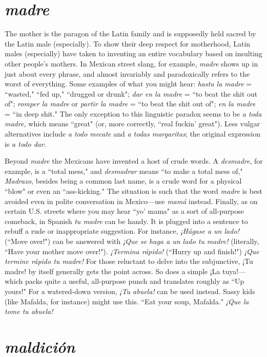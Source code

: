 \section{\emph{madre}}

The mother is the paragon of the Latin family and is supposedly held sacred by the Latin male (especially). To show their deep respect for motherhood, Latin males (especially) have taken to inventing an entire vocabulary based on insulting other people's mothers. In
Mexican street slang, for example, \emph{madre} shows up in just about every
phrase, and almost invariably and paradoxically refers to the worst of
everything. Some examples of what you might hear: \emph{hasta la madre} =
``wasted," ``fed up," ``drugged or drunk"; \emph{dar en la madre} = ``to beat
the shit out of"; \emph{romper la madre} or \emph{partir la madre} = ``to beat the
shit out of"; \emph{en la madre} = ``in deep shit." The only exception to this
linguistic paradox seems to be \emph{a toda madre,} which means ``great" (or,
more correctly, ``real fuckin' great"). Less vulgar alternatives include
\emph{a todo mecate} and \emph{a todas margaritas}; the original expression is \emph{a todo dar}.

Beyond \emph{madre} the Mexicans have invented a host of crude
words. A \emph{desmadre}, for example, is a ``total mess," and \emph{desmadrar}
means ``to make a total mess of," \emph{Madrazo}, besides being a common
last name, is a crude word for a physical ``blow" or even an ``ass-kicking." The situation is such that the word \emph{madre} is best avoided
even in polite conversation in Mexico---use \emph{mamá} instead. Finally, as
on certain U.S. streets where you may hear ``yo' mama" as a sort of all-purpose comeback, in Spanish \emph{tu madre} can be handy. It is plugged
into a sentence to rebuff a rude or inappropriate suggestion. For instance, \emph{¡Hágase a un lado!} (``Move over!") can be answered with \emph{¡Que
	se haga a un lado tu madre!} (literally, ``Have your mother move over!").
\emph{¡Termina rápido!} (``Hurry up and finish!") \emph{¡Que termine rápido tu
	madre!} For those reluctant to delve into the subjunctive, ¡Tu madre!
by itself generally gets the point across. So does a simple ¡La tuya!--- which packs quite a useful, all-purpose punch and translates roughly
as ``Up yours!" For a watered-down version, \emph{¡Tu abuela!} can be used
instead. Sassy kids (like Mafalda, for instance) might use this. ``Eat
your soup, Mafalda." \emph{¡Que la tome tu abuela!}

\section{\emph{maldición}}

